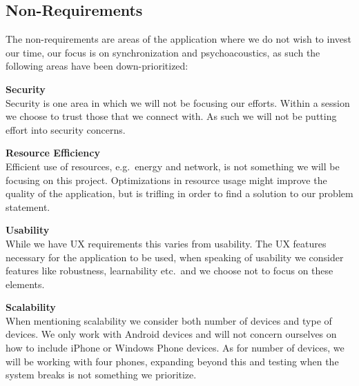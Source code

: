 \subsection*{Non-Requirements}\label{par:non_requirements}
The non-requirements are areas of the application where we do not wish to invest our time, our focus is on synchronization and psychoacoustics, as such the following areas have been down-prioritized:
\begin{eromanrate}
    \item \textbf{Security} \hfill\\
    Security is one area in which we will not be focusing our efforts.
    Within a session we choose to trust those that we connect with.
    As such we will not be putting effort into security concerns.
    \item \textbf{Resource Efficiency} \hfill\\
    Efficient use of resources, e.g.~energy and network, is not something we will be focusing on this project.
    Optimizations in resource usage might improve the quality of the application, but is trifling in order to find a solution to our problem statement.
    \item \textbf{Usability} \hfill\\
    While we have \ac{UX} requirements this varies from usability.
    The \ac{UX} features necessary for the application to be used, when speaking of usability we consider features like robustness, learnability etc.~and we choose not to focus on these elements.
    \item \textbf{Scalability} \hfill\\
    When mentioning scalability we consider both number of devices and type of devices.
    We only work with Android devices and will not concern ourselves on how to include iPhone or Windows Phone devices.
    As for number of devices, we will be working with four phones, expanding beyond this and testing when the system breaks is not something we prioritize.
\end{eromanrate}
